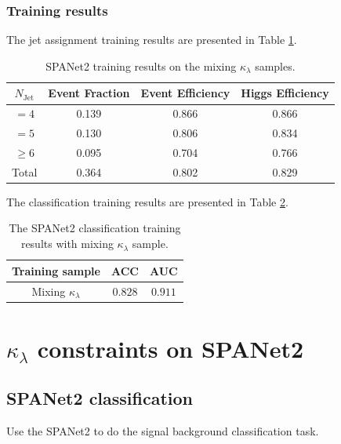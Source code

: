 \documentclass[12pt]{article}
\begin{document}
		\subsubsection{Training results}%
		\label{subs:training_results}
			The jet assignment training results are presented in Table \ref{tab:SPANet2_diHiggs_4b_pt40_mix_class}.
			\begin{table}[htpb]
				\centering
				\caption{SPANet2 training results on the mixing $\kappa_\lambda$ samples.}
				\label{tab:SPANet2_diHiggs_4b_pt40_mix_class}
				\begin{tabular}{c|c|cc}
					$N_\text{Jet}$ & Event Fraction & Event Efficiency & Higgs Efficiency \\
					\hline
					$=4$	  &   0.139             &    0.866              &    0.866             \\
					$=5$	  &   0.130             &    0.806              &    0.834             \\
					$\ge 6$	  &   0.095             &    0.704              &    0.766             \\
					Total	  &   0.364             &    0.802              &    0.829             \\
				\end{tabular}
			\end{table}	

			The classification training results are presented in Table \ref{tab:SPANET_cls_results}.
			\begin{table}[htpb]
				\centering
				\caption{The SPANet2 classification training results with mixing $\kappa_\lambda$ sample.}
				\label{tab:SPANET_cls_results}
				\begin{tabular}{c|cc}
				Training sample        & ACC     & AUC   \\ \hline
				Mixing $\kappa_\lambda $ & $0.828$ & $0.911$
				\end{tabular}      
			\end{table}

\section{\texorpdfstring{$\kappa_\lambda$}{kappa} constraints on SPANet2}%
\label{sec:kappa_constraints_on_spanet2}

	\subsection{SPANet2 classification}%
	\label{sub:spanet2_classification}
		Use the SPANet2 to do the signal background classification task. 
\end{document}
